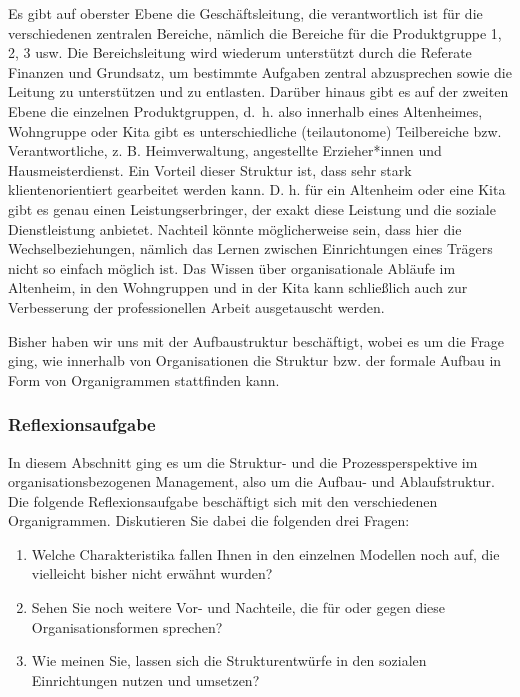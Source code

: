 \documentclass[
  letterpaper,
]{book}
\begin{document}
Es gibt auf oberster Ebene die Geschäftsleitung, die verantwortlich ist
für die verschiedenen zentralen Bereiche, nämlich die Bereiche für die
Produktgruppe 1, 2, 3 usw. Die Bereichsleitung wird wiederum unterstützt
durch die Referate Finanzen und Grundsatz, um bestimmte Aufgaben zentral
abzusprechen sowie die Leitung zu unterstützen und zu entlasten. Darüber
hinaus gibt es auf der zweiten Ebene die einzelnen Produktgruppen, d.~h.
also innerhalb eines Altenheimes, Wohngruppe oder Kita gibt es
unterschiedliche (teilautonome) Teilbereiche bzw. Verantwortliche, z. B.
Heimverwaltung, angestellte Erzieher*innen und Hausmeisterdienst. Ein
Vorteil dieser Struktur ist, dass sehr stark klientenorientiert
gearbeitet werden kann. D. h. für ein Altenheim oder eine Kita gibt es
genau einen Leistungserbringer, der exakt diese Leistung und die soziale
Dienstleistung anbietet. Nachteil könnte möglicherweise sein, dass hier
die Wechselbeziehungen, nämlich das Lernen zwischen Einrichtungen eines
Trägers nicht so einfach möglich ist. Das Wissen über organisationale
Abläufe im Altenheim, in den Wohngruppen und in der Kita kann
schließlich auch zur Verbesserung der professionellen Arbeit
ausgetauscht werden.

Bisher haben wir uns mit der Aufbaustruktur beschäftigt, wobei es um die
Frage ging, wie innerhalb von Organisationen die Struktur bzw. der
formale Aufbau in Form von Organigrammen stattfinden kann.

\subsubsection{Reflexionsaufgabe}\label{reflexionsaufgabe}

In diesem Abschnitt ging es um die Struktur- und die Prozessperspektive
im organisationsbezogenen Management, also um die Aufbau- und
Ablaufstruktur. Die folgende Reflexionsaufgabe beschäftigt sich mit den
verschiedenen Organigrammen. Diskutieren Sie dabei die folgenden drei
Fragen:

\begin{enumerate}
\def\labelenumi{\arabic{enumi}.}
\item
  Welche Charakteristika fallen Ihnen in den einzelnen Modellen noch
  auf, die vielleicht bisher nicht erwähnt wurden?
\item
  Sehen Sie noch weitere Vor- und Nachteile, die für oder gegen diese
  Organisationsformen sprechen?
\item
  Wie meinen Sie, lassen sich die Strukturentwürfe in den sozialen
  Einrichtungen nutzen und umsetzen?
\end{enumerate}
\end{document}
